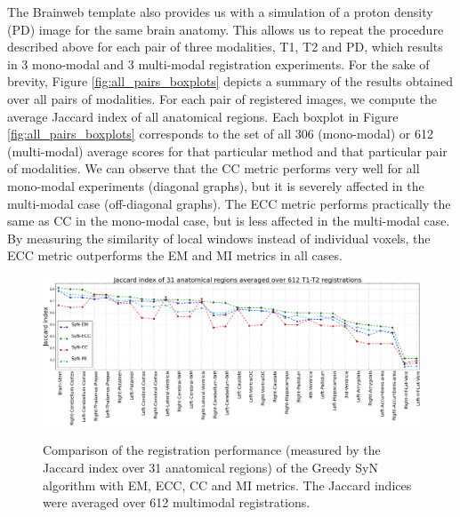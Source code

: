 The Brainweb template also provides us with a simulation of a proton density (PD) image for the same brain anatomy. This allows us to repeat the procedure described above for each pair of three modalities, T1, T2 and PD, which results in 3 mono-modal and 3 multi-modal registration experiments. For the sake of brevity, Figure \ref{fig:all_pairs_boxplots} depicts a summary of the results obtained over all pairs of modalities. For each pair of registered images, we compute the average Jaccard index of all anatomical regions. Each boxplot in Figure \ref{fig:all_pairs_boxplots} corresponds to the set of all 306 (mono-modal) or 612 (multi-modal) average scores for that particular method and that particular pair of modalities. We can observe that the CC metric performs very well for all mono-modal experiments (diagonal graphs), but it is severely affected in the multi-modal case (off-diagonal graphs). The ECC metric performs practically the same as CC in the mono-modal case, but is less affected in the multi-modal case. By measuring the similarity of local windows instead of individual voxels, the ECC metric outperforms the EM and MI metrics in all cases.

%


\begin{figure}[t!]
\centering
\includegraphics[width=1.0\linewidth]{./images/multi_lines_seg.png}\\
\caption{{\small Comparison of the registration performance (measured by the Jaccard index over 31 anatomical regions) of the Greedy SyN algorithm with EM, ECC, CC and MI metrics. The Jaccard indices were averaged over 612 multimodal registrations.}}
\label{fig:multi_seg}
\end{figure}

